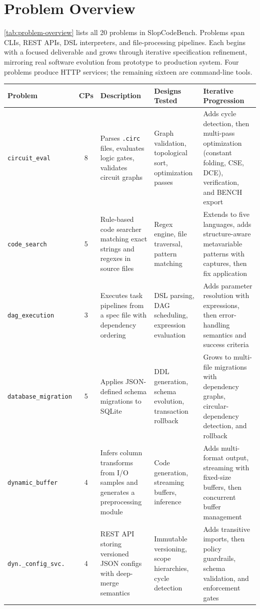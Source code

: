 \section{Problem Overview}\label{sec:problem-overview}

\autoref{tab:problem-overview} lists all 20 problems in SlopCodeBench. Problems span CLIs, REST APIs, DSL interpreters, and file-processing pipelines. Each begins with a focused deliverable and grows through iterative specification refinement, mirroring real software evolution from prototype to production system. Four problems produce HTTP services; the remaining sixteen are command-line tools.

\begin{table}[h]
\centering
\scriptsize
\setlength{\tabcolsep}{3.5pt}
\begin{tabular}{lcp{3.6cm}p{3.2cm}p{3.6cm}}
\toprule
Problem & CPs & Description & Designs Tested & Iterative Progression \\
\midrule
\texttt{circuit\_eval}       & 8 & Parses \texttt{.circ} files, evaluates logic gates, validates circuit graphs & Graph validation, topological sort, optimization passes & Adds cycle detection, then multi-pass optimization (constant folding, CSE, DCE), verification, and BENCH export \\[4pt]
\texttt{code\_search}        & 5 & Rule-based code searcher matching exact strings and regexes in source files & Regex engine, file traversal, pattern matching & Extends to five languages, adds structure-aware metavariable patterns with captures, then fix application \\[4pt]
\texttt{dag\_execution}      & 3 & Executes task pipelines from a spec file with dependency ordering & DSL parsing, DAG scheduling, expression evaluation & Adds parameter resolution with expressions, then error-handling semantics and success criteria \\[4pt]
\texttt{database\_migration} & 5 & Applies JSON-defined schema migrations to SQLite & DDL generation, schema evolution, transaction rollback & Grows to multi-file migrations with dependency graphs, circular-dependency detection, and rollback \\[4pt]
\texttt{dynamic\_buffer}     & 4 & Infers column transforms from I/O samples and generates a preprocessing module & Code generation, streaming buffers, inference & Adds multi-format output, streaming with fixed-size buffers, then concurrent buffer management \\[4pt]
\texttt{dyn.\_config\_svc.}  & 4 & REST API storing versioned JSON configs with deep-merge semantics & Immutable versioning, scope hierarchies, cycle detection & Adds transitive imports, then policy guardrails, schema validation, and enforcement gates \\[4pt]

\end{tabular}
\end{table}
